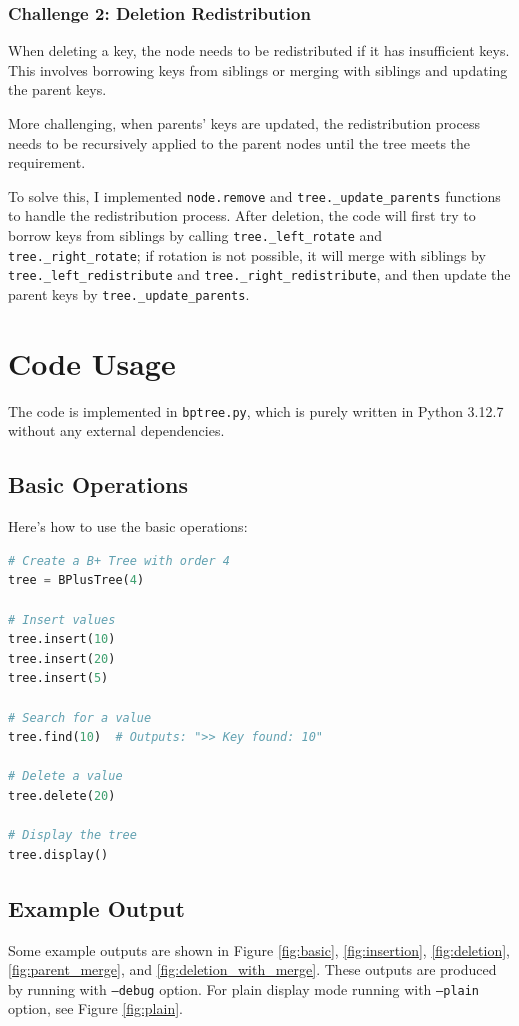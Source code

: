 \documentclass[11pt]{article}
\begin{document}
\subsubsection{Challenge 2: Deletion Redistribution}

When deleting a key, the node needs to be redistributed if it has insufficient keys. This involves borrowing keys from siblings or merging with siblings and updating the parent keys.

More challenging, when parents' keys are updated, the redistribution process needs to be recursively applied to the parent nodes until the tree meets the requirement.

To solve this, I implemented \texttt{node.remove} and \texttt{tree.\_update\_parents} functions to handle the redistribution process. After deletion, the code will first try to borrow keys from siblings by calling \texttt{tree.\_left\_rotate} and \texttt{tree.\_right\_rotate}; if rotation is not possible, it will merge with siblings by \texttt{tree.\_left\_redistribute} and \texttt{tree.\_right\_redistribute}, and then update the parent keys by \texttt{tree.\_update\_parents}.


\section{Code Usage}

The code is implemented in \texttt{bptree.py}, which is purely written in Python 3.12.7 without any external dependencies.

\subsection{Basic Operations}
Here's how to use the basic operations:

\begin{lstlisting}[language=Python]
# Create a B+ Tree with order 4
tree = BPlusTree(4)

# Insert values
tree.insert(10)
tree.insert(20)
tree.insert(5)

# Search for a value
tree.find(10)  # Outputs: ">> Key found: 10"

# Delete a value
tree.delete(20)

# Display the tree
tree.display()
\end{lstlisting}

\subsection{Example Output}
Some example outputs are shown in Figure \ref{fig:basic}, \ref{fig:insertion}, \ref{fig:deletion}, \ref{fig:parent_merge}, and \ref{fig:deletion_with_merge}. These outputs are produced by running with \texttt{--debug} option. For plain display mode running with \texttt{--plain} option, see Figure \ref{fig:plain}.
\end{document}
